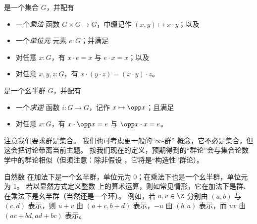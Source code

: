 \begin{defn}
  是一个集合 $G$，并配有
  \begin{itemize}
  \item 一个\emph{乘法}
    函数 $G\times G\to G$，中缀记作 $(x,y) \mapsto x\cdot y$；以及
  \item 一个\emph{单位元}
    元素 $e:G$；并满足
  \item 对任意 $x:G$，有 $x\cdot e = x$ 与 $e\cdot x = x$；以及
  \item 对任意 $x,y,z:G$，有 $x\cdot (y\cdot z) = (x\cdot y)\cdot z$。
  \end{itemize}
  是一个幺半群 $G$，并配有
  \begin{itemize}
  \item 一个\emph{求逆}
    函数 $i:G\to G$，记作 $x\mapsto \opp x$；且满足
  \item 对任意 $x:G$，有 $x\cdot \opp x = e$ 与 $\opp x \cdot x = e$。
  \end{itemize}
\end{defn}

\begin{rmk}\label{rmk:infty-group}
注意我们要求群是集合。
我们也可考虑更一般的“$\infty$-群”%
概念，它不必是集合，但这会把讨论带离当前主题。
按我们现在的定义，预期得到的“群论”会与集合论数学中的群论相似（但须注意：除非假设 \LEM{}，它将是“构造性”群论）。
\end{rmk}

\begin{eg}
  自然数 \N 在加法下是一个幺半群，单位元为 $0$；在乘法下也是一个幺半群，单位元为 $1$。
  若以显然方式定义整数 \Z 上的算术运算，则如常见情形，它在加法下是群、在乘法下是幺半群（当然还是一个环）。
  例如，若 $u, v \in \Z$ 分别由 $(a,b)$ 与 $(c,d)$ 表示，则 $u + v$ 由 $(a + c, b + d)$ 表示，$-u$ 由 $(b, a)$ 表示，而 $u v$ 由 $(a c + b d, a d + b c)$ 表示。
\end{eg}

